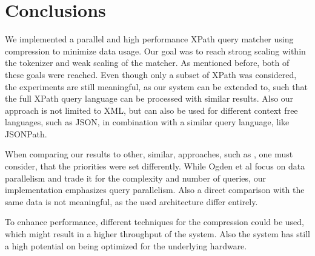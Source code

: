 \section{Conclusions}

We implemented a parallel and high performance XPath query matcher using compression to minimize data usage. Our goal was to reach strong scaling within the tokenizer and weak scaling of the matcher. As mentioned before, both of these goals were reached. Even though only a subset of XPath was considered, the experiments are still meaningful, as our system can be extended to, such that the full XPath query language can be processed with similar results. Also our approach is not limited to XML, but can also be used for different context free languages, such as JSON, in combination with a similar query language, like JSONPath.

When comparing our results to other, similar, approaches, such as \cite{Ogden2013}, one must consider, that the priorities were set differently. While Ogden et al focus on data parallelism and trade it for the complexity and number of queries, our implementation emphasizes query parallelism. Also a direct comparison with the same data is not meaningful, as the used architecture differ entirely.

To enhance performance, different techniques for the compression could be used, which might result in a higher throughput of the system. Also the system has still a high potential on being optimized for the underlying hardware.